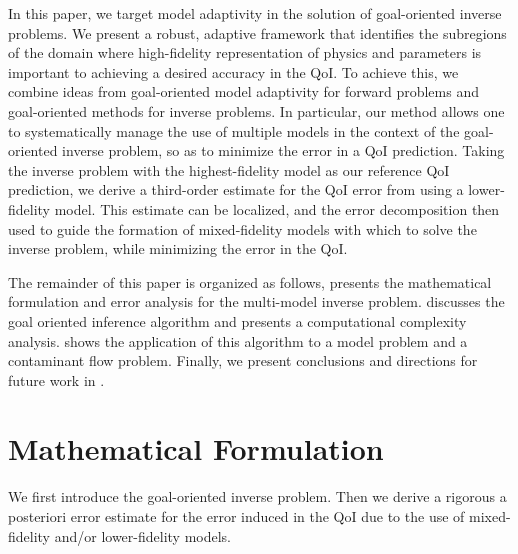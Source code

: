 \documentclass[review]{siamart0516}
\providecommand{\DIFaddtex}[1]{{\protect\color{blue} \sf #1}} %
\providecommand{\DIFaddbegin}{} %
\providecommand{\DIFaddend}{} %
\providecommand{\DIFadd}[1]{\texorpdfstring{\DIFaddtex{#1}}{#1}} %
\newcommand{\DIFaddincludegraphics}[2][]{{\color{blue}\fbox{\DIFOincludegraphics[#1]{#2}}}} %
\DeclareRobustCommand{\DIFaddbegin}{\DIFOaddbegin \let\includegraphics\DIFaddincludegraphics} %
\DeclareRobustCommand{\DIFaddend}{\DIFOaddend \let\includegraphics\DIFOincludegraphics} %
\begin{document}
In this paper, we target model adaptivity \DIFaddbegin \DIFadd{in }\DIFaddend the solution of goal-oriented inverse problems. We present a robust, adaptive framework that identifies the subregions of the domain where high-fidelity representation of physics and parameters is important to achieving a desired accuracy in the QoI. To achieve this, we combine ideas from goal-oriented model adaptivity for forward problems and goal-oriented methods for inverse problems. In particular, our method allows one to systematically manage the use of multiple models in the context of the goal-oriented inverse problem, so as to minimize the error in a QoI prediction. Taking the inverse problem with the highest-fidelity model as our reference QoI prediction, we derive a third-order estimate for the QoI error from using a lower-fidelity model. This estimate can be localized, and the error decomposition then used to guide the formation of mixed-fidelity models with which to solve the inverse problem, while minimizing the error in the QoI. 

The remainder of this paper is organized as follows,  presents the mathematical formulation and error analysis for the multi-model inverse problem.  discusses the goal oriented inference algorithm and presents a computational complexity analysis.  shows the application of this algorithm to a model problem and a contaminant flow problem. Finally, we present conclusions and directions for future work in .

\section{Mathematical Formulation}\label{sec:form}
%
We first introduce the goal-oriented inverse problem. Then we derive a rigorous a posteriori error estimate for the error induced in the QoI due to the use of mixed-fidelity and/or lower-fidelity models.

\end{document}
